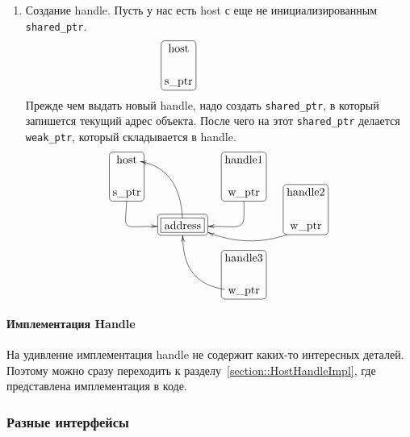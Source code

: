 \begin{enumerate}
\item Создание handle.
Пусть у нас есть host с еще не инициализированным \verb"shared_ptr".
\[
\xymatrix@R=15pt@C=15pt{
  {\text{host}}
  	{
	\save
   [].[d]*[F-:<3pt>]\frm{}
   \restore
	}
  &{}&{\phantom{handle}}
  \\ 
  {\text{s\_ptr}}%
  &{}&{\phantom{s\_ptr}}\\
}
\]
Прежде чем выдать новый handle, надо создать \verb"shared_ptr", в который запишется текущий адрес объекта.
После чего на этот \verb"shared_ptr" делается \verb"weak_ptr", который складывается в handle.
\[
\xymatrix@R=15pt@C=15pt{
  {\text{host}}
  	{
	\save
   [].[d]*[F-:<3pt>]\frm{}
   \restore
	}
  &{}&{\text{handle1}}
    	{
	\save
   [].[d]*[F-:<3pt>]\frm{}
   \restore
	}&{}
  \\ 
  {\text{s\_ptr}}\ar@(d,l)[dr]+(-8,0)&{}&{\text{w\_ptr}}\ar@(d,r)[dl]+(8,0)&{\text{handle2}}
   	{
	\save
   [].[d]*[F-:<3pt>]\frm{}
   \restore
	}
  \\
  {}&{\text{address}}\ar@(u,r)[uul]
      	{
	\save
   [].[]*[F-]\frm{}
   \restore
	}
    	{
	\save
   [].[]*+[F-:<3pt>]\frm{}
   \restore
	}
  &{}&{\text{w\_ptr}}\ar@/^10pt/[ll]+(8,-2)\\
  {}&{}&{\text{handle3}}
   	{
	\save
   [].[d]*[F-:<3pt>]\frm{}
   \restore
	}
  &{}\\
  {}&{}&{\text{w\_ptr}}\ar@(l,d)[luu]+(0,-3)&{}\\
}
\]
\end{enumerate}

\paragraph{Имплементация Handle}

На удивление имплементация handle не содержит каких-то интересных деталей.
Поэтому можно сразу переходить к разделу~\ref{section::HostHandleImpl}, где представлена имплементация в коде.

\subsubsection{Разные интерфейсы}

